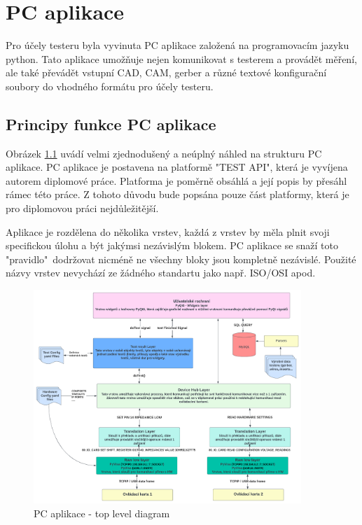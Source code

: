 \chapter{PC aplikace}
Pro účely testeru byla vyvinuta PC aplikace založená na programovacím jazyku python. Tato aplikace umožňuje
nejen komunikovat s testerem a provádět měření, ale také převádět vstupní CAD, CAM, gerber a různé textové konfigurační
soubory do vhodného formátu pro účely testeru.\par

\section{Principy funkce PC aplikace}
Obrázek \ref{fig: PCAPP top level diagram} uvádí velmi zjednodušený a neúplný náhled na strukturu PC aplikace.
PC aplikace je postavena na platformě "TEST API", která je vyvíjena autorem diplomové práce. Platforma je poměrně obsáhlá
a její popis by přesáhl rámec této práce. Z tohoto důvodu bude popsána pouze část platformy, která je pro diplomovou práci nejdůležitější.\par

Aplikace je rozdělena do několika vrstev, každá z vrstev by měla plnit svoji specifickou úlohu a být jakýmsi nezávislým blokem.
PC aplikace se snaží toto "pravidlo"\ dodržovat nicméně ne všechny bloky jsou kompletně nezávislé.
Použité názvy vrstev nevychází ze žádného standartu jako např. ISO/OSI apod.\par

\begin{figure}[ht!]
    \centering
    \includegraphics[width = 0.9\textwidth]{obrazky/PC_app_diagram.png}
    \caption{PC aplikace - top level diagram}
    \label{fig: PCAPP top level diagram}
\end{figure}


